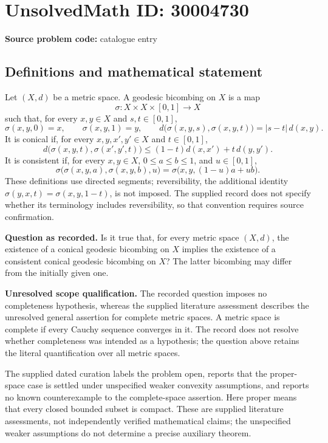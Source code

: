 \documentclass[11pt]{article}
\begin{document}
\section*{UnsolvedMath ID: 30004730}
\textbf{Source problem code:} catalogue entry
\subsection{Definitions and mathematical statement}
Let \((X,d)\) be a metric space. A geodesic bicombing on \(X\) is a map
\[
\sigma:X\times X\times[0,1]\longrightarrow X
\]
such that, for every \(x,y\in X\) and \(s,t\in[0,1]\),
\[
\sigma(x,y,0)=x,\qquad \sigma(x,y,1)=y,\qquad
 d\bigl(\sigma(x,y,s),\sigma(x,y,t)\bigr)=|s-t|\,d(x,y).
\]
It is conical if, for every \(x,y,x',y'\in X\) and \(t\in[0,1]\),
\[
 d\bigl(\sigma(x,y,t),\sigma(x',y',t)\bigr)
 \leq (1-t)d(x,x')+t\,d(y,y').
\]
It is consistent if, for every \(x,y\in X\), \(0\leq a\leq b\leq1\), and \(u\in[0,1]\),
\[
\sigma\bigl(\sigma(x,y,a),\sigma(x,y,b),u\bigr)
 =\sigma\bigl(x,y,(1-u)a+ub\bigr).
\]
These definitions use directed segments; reversibility, the additional identity \(\sigma(y,x,t)=\sigma(x,y,1-t)\), is not imposed. The supplied record does not specify whether its terminology includes reversibility, so that convention requires source confirmation.

\textbf{Question as recorded.} Is it true that, for every metric space \((X,d)\), the existence of a conical geodesic bicombing on \(X\) implies the existence of a consistent conical geodesic bicombing on \(X\)? The latter bicombing may differ from the initially given one.

\textbf{Unresolved scope qualification.} The recorded question imposes no completeness hypothesis, whereas the supplied literature assessment describes the unresolved general assertion for complete metric spaces. A metric space is complete if every Cauchy sequence converges in it. The record does not resolve whether completeness was intended as a hypothesis; the question above retains the literal quantification over all metric spaces.

The supplied dated curation labels the problem open, reports that the proper-space case is settled under unspecified weaker convexity assumptions, and reports no known counterexample to the complete-space assertion. Here proper means that every closed bounded subset is compact. These are supplied literature assessments, not independently verified mathematical claims; the unspecified weaker assumptions do not determine a precise auxiliary theorem.
\end{document}
